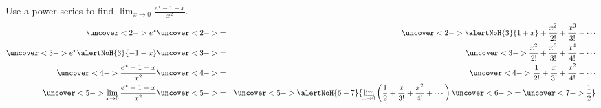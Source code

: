 \begin{frame}
\begin{example}[Example 11, p. 780]
Use a power series to find $\displaystyle \lim_{x\to 0}\frac{e^x - 1 - x}{x^2}$.
\abovedisplayskip=0pt
\belowdisplayskip=0pt
\begin{eqnarray*}
\uncover<2->{%
e^x%
}%
& \uncover<2->{=} &%
\uncover<2->{%
\alertNoH{ 3}{1 + x } + \frac{x^2}{2!} + \frac{x^3}{3!} + \cdots %
}\\%
\uncover<3->{%
e^x \alertNoH{ 3}{ - 1 - x}%
}%
& \uncover<3->{=} &%
\uncover<3->{%
\frac{x^2}{2!} + \frac{x^3}{3!} + \frac{x^4}{4!} + \cdots %
}\\%
\uncover<4->{%
\frac{e^x  - 1 - x}{x^2}%
}%
& \uncover<4->{=} &%
\uncover<4->{%
\frac{1}{2!} + \frac{x}{3!} + \frac{x^2}{4!} + \cdots %
}\\%
\uncover<5->{%
\lim_{x\to 0}\frac{e^x  - 1 - x}{x^2}%
}%
& \uncover<5->{=} &%
\uncover<5->{%
\alertNoH{ 6-7}{%
\lim_{x\to 0}\left( \frac{1}{2} + \frac{x}{3!} + \frac{x^2}{4!} + \cdots \right) \uncover<6->{= \uncover<7->{\frac{1}{2}}} %
}%
}%
\end{eqnarray*}
\end{example}
\end{frame}
